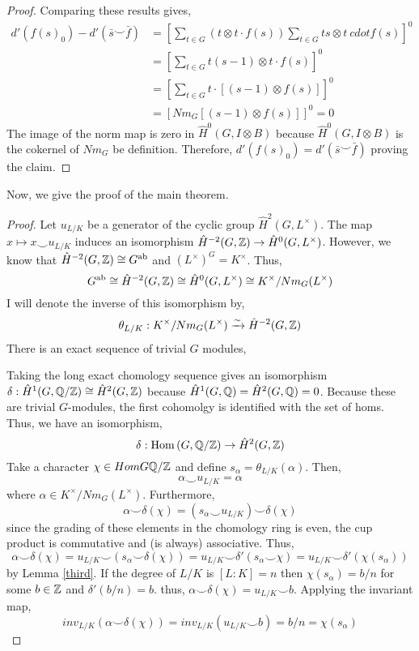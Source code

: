 \documentclass[12pt]{extarticle}
\begin{document}
\begin{proof}
Comparing these results gives,
\begin{align*}
d'(f(s)_0) - d'(\bar{s} \smile \bar{f}) & = \left[ \sum_{t \in G} (t \otimes t \cdot f(s))  \sum_{t \in G} ts \otimes t\ cdot f(s) \right]^0
\\
& = \left[ \sum_{t \in G} t(s-1) \otimes t \cdot f(s) \right]^0
\\
& = \left[ \sum_{t \in G} t \cdot \left[ (s - 1) \otimes f(s) \right] \right]^0
\\
& = \left[ Nm_G[ (s - 1) \otimes f(s) ] \right]^0 = 0 
\end{align*}
The image of the norm map is zero in $\hat{H}^0(G, I \otimes B)$ because $\hat{H}^0(G, I \otimes B)$ is the cokernel of $Nm_G$ be definition. Therefore, $d'(f(s)_0) = d'(\bar{s} \smile \bar{f})$ proving the claim. 
\end{proof}
\noindent
Now, we give the proof of the main theorem.
\begin{proof}
Let $u_{L/K}$ be a generator of the cyclic group $\hat{H}^2(G, L^\times)$. The map $x \mapsto x \smile u_{L/K}$ induces an isomorphism $\hat{H}^{-2}(G, \mathbb{Z}) \to \hat{H}^0(G, L^\times)$. However, we know that $\hat{H}^{-2}(G,\mathbb{Z}) \cong G^{\text{ab}}$ and $(L^\times)^G = K^\times$. Thus,
\[ G^{\text{ab}} \cong \hat{H}^{-2}(G, \mathbb{Z}) \cong \hat{H}^0(G, L^\times) \cong K^\times / Nm_G(L^\times) \]
I will denote the inverse of this isomorphism by,
\[ \theta_{L/K} : K^\times / Nm_G(L^\times) \xrightarrow{\sim} \hat{H}^{-2}(G, \mathbb{Z}) \] 
There is an exact sequence of trivial $G$ modules,
\begin{center}
\end{center}
Taking the long exact chomology sequence gives an isomorphism $\delta : \hat{H}^1(G, \mathbb{Q} / \mathbb{Z}) \cong \hat{H}^2(G, \mathbb{Z})$ because $\hat{H}^1(G, \mathbb{Q}) = \hat{H}^2(G, \mathbb{Q}) = 0$. Because these are trivial $G$-modules, the first cohomolgy is identified with the set of homs. Thus, we have an isomorphism,
\[ \delta : \mathrm{Hom}\left(G, \mathbb{Q} / \mathbb{Z}\right) \to \hat{H}^2(G, \mathbb{Z}) \]
Take a character $\chi \in Hom{G}{\mathbb{Q} / \mathbb{Z}}$ and define $s_\alpha = \theta_{L/K}(\alpha)$. Then,
\[ \alpha \smile u_{L/K} = \alpha \]
where $\alpha \in K^\times / Nm_G(L^\times)$.  
Furthermore,
\[ \alpha \smile \delta(\chi) = (s_{\alpha} \smile u_{L/K}) \smile \delta(\chi) \]
since the grading of these elements in the chomology ring is even, the cup product is commutative and (is always) associative. Thus,
\[ \alpha \smile \delta(\chi) = u_{L/K} \smile (s_{\alpha} \smile \delta(\chi)) = u_{L/K} \smile \delta'(s_\alpha \smile \chi) = u_{L/K} \smile \delta'(\chi(s_\alpha)) \]
by Lemma \ref{third}. If the degree of $L/K$ is $[L : K] = n$ then $\chi(s_\alpha) = b/n$ for some $b \in \mathbb{Z}$ and $\delta'(b/n) = b$. thus, $\alpha \smile \delta(\chi) = u_{L/K} \smile b$. Applying the invariant map,
\[ inv_{L/K}(\alpha \smile \delta(\chi)) = inv_{L/K}(u_{L/K} \smile b) = b / n = \chi(s_{\alpha}) \] 
\end{proof}
\end{document}
